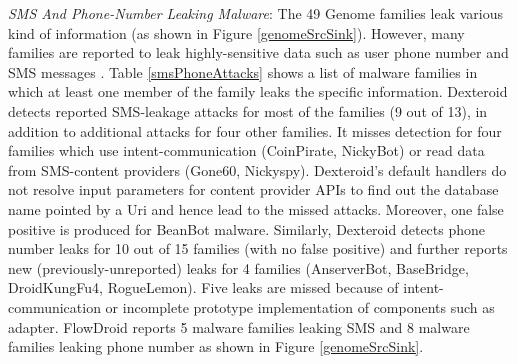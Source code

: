 \documentclass[10pt]{elsarticle}
\begin{document}
{\noindent \emph{SMS And Phone-Number Leaking Malware}:} The 49 Genome families leak various kind of information (as shown in Figure \ref{genomeSrcSink}). However, many families are reported to leak highly-sensitive data such as user phone number and SMS messages \cite{dissectingAndroid}. Table \ref{smsPhoneAttacks} shows a list of malware families in which at least one member of the family leaks the specific information. Dexteroid detects reported SMS-leakage attacks for most of the families (9 out of 13), in addition to additional attacks for four other families. It misses detection for four families which use intent-communication (CoinPirate, NickyBot) or read data from SMS-content providers (Gone60, Nickyspy). Dexteroid's default handlers do not resolve input parameters for content provider APIs to find out the database name pointed by a Uri and hence lead to the missed attacks. Moreover, one false positive is produced for BeanBot malware. Similarly, Dexteroid detects phone number leaks for 10 out of 15 families (with no false positive) and further reports new (previously-unreported) leaks for 4 families (AnserverBot, BaseBridge, DroidKungFu4, RogueLemon). Five leaks are missed because of intent-communication or incomplete prototype implementation of components such as adapter. FlowDroid reports 5 malware families leaking SMS and 8 malware families leaking phone number as shown in Figure \ref{genomeSrcSink}.
\end{document}
